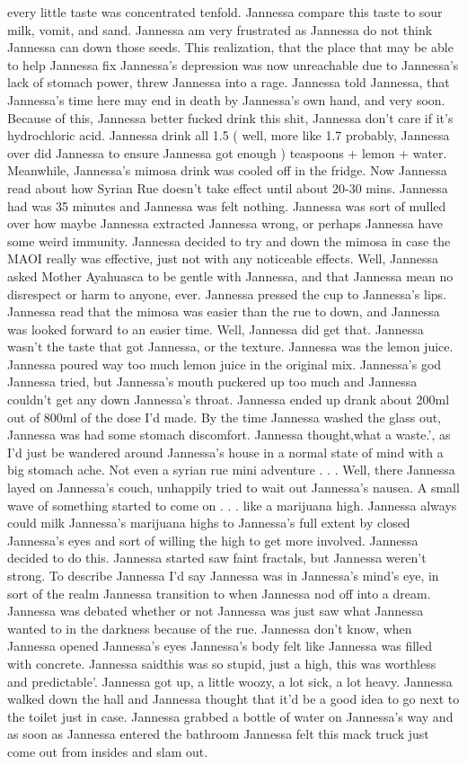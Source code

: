 \documentclass[12pt]{book}
\begin{document}
every little taste was concentrated tenfold. Jannessa compare this taste to sour milk, vomit, and sand. Jannessa am very frustrated as Jannessa do not think Jannessa can down those seeds. This realization, that the place that may be able to help Jannessa fix Jannessa's depression was now unreachable due to Jannessa's lack of stomach power, threw Jannessa into a rage. Jannessa told Jannessa, that Jannessa's time here may end in death by Jannessa's own hand, and very soon. Because of this, Jannessa better fucked drink this shit, Jannessa don't care if it's hydrochloric acid. Jannessa drink all 1.5 ( well, more like 1.7 probably, Jannessa over did Jannessa to ensure Jannessa got enough ) teaspoons + lemon + water. Meanwhile, Jannessa's mimosa drink was cooled off in the fridge. Now Jannessa read about how Syrian Rue doesn't take effect until about 20-30 mins. Jannessa had was 35 minutes and Jannessa was felt nothing. Jannessa was sort of mulled over how maybe Jannessa extracted Jannessa wrong, or perhaps Jannessa have some weird immunity. Jannessa decided to try and down the mimosa in case the MAOI really was effective, just not with any noticeable effects. Well, Jannessa asked Mother Ayahuasca to be gentle with Jannessa, and that Jannessa mean no disrespect or harm to anyone, ever. Jannessa pressed the cup to Jannessa's lips. Jannessa read that the mimosa was easier than the rue to down, and Jannessa was looked forward to an easier time. Well, Jannessa did get that. Jannessa wasn't the taste that got Jannessa, or the texture. Jannessa was the lemon juice. Jannessa poured way too much lemon juice in the original mix. Jannessa's god Jannessa tried, but Jannessa's mouth puckered up too much and Jannessa couldn't get any down Jannessa's throat. Jannessa ended up drank about 200ml out of 800ml of the dose I'd made. By the time Jannessa washed the glass out, Jannessa was had some stomach discomfort. Jannessa thought,what a waste.', as I'd just be wandered around Jannessa's house in a normal state of mind with a big stomach ache. Not even a syrian rue mini adventure . . .  Well, there Jannessa layed on Jannessa's couch, unhappily tried to wait out Jannessa's nausea. A small wave of something started to come on . . .  like a marijuana high. Jannessa always could milk Jannessa's marijuana highs to Jannessa's full extent by closed Jannessa's eyes and sort of willing the high to get more involved. Jannessa decided to do this. Jannessa started saw faint fractals, but Jannessa weren't strong. To describe Jannessa I'd say Jannessa was in Jannessa's mind's eye, in sort of the realm Jannessa transition to when Jannessa nod off into a dream. Jannessa was debated whether or not Jannessa was just saw what Jannessa wanted to in the darkness because of the rue. Jannessa don't know, when Jannessa opened Jannessa's eyes Jannessa's body felt like Jannessa was filled with concrete. Jannessa saidthis was so stupid, just a high, this was worthless and predictable'. Jannessa got up, a little woozy, a lot sick, a lot heavy. Jannessa walked down the hall and Jannessa thought that it'd be a good idea to go next to the toilet just in case. Jannessa grabbed a bottle of water on Jannessa's way and as soon as Jannessa entered the bathroom Jannessa felt this mack truck just come out from insides and slam out. 
\end{document}
